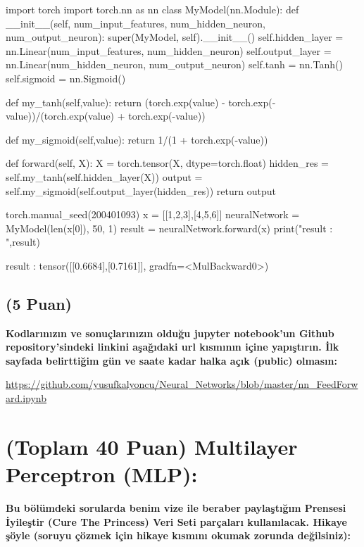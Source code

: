 \documentclass[11pt]{article}
\begin{document}
\begin{python}
import torch
import torch.nn as nn
class MyModel(nn.Module):
    def __init__(self, num_input_features, num_hidden_neuron, num_output_neuron):
        super(MyModel, self).__init__()
        self.hidden_layer = nn.Linear(num_input_features, num_hidden_neuron)
        self.output_layer = nn.Linear(num_hidden_neuron, num_output_neuron)
        self.tanh = nn.Tanh()
        self.sigmoid = nn.Sigmoid()
        
    def my_tanh(self,value):
        return (torch.exp(value) - torch.exp(-value))/(torch.exp(value) + torch.exp(-value))
    
    def my_sigmoid(self,value):
        return 1/(1 + torch.exp(-value))

    def forward(self, X):
        X = torch.tensor(X, dtype=torch.float)
        hidden_res = self.my_tanh(self.hidden_layer(X))
        output = self.my_sigmoid(self.output_layer(hidden_res))
        return output
        
torch.manual_seed(200401093)
x = [[1,2,3],[4,5,6]]
neuralNetwork = MyModel(len(x[0]), 50, 1)
result = neuralNetwork.forward(x)
print("result : ",result)
\end{python}

result :  tensor([[0.6684],[0.7161]], gradfn=<MulBackward0>)

\subsection{(5 Puan)} \textbf{Kodlarınızın ve sonuçlarınızın olduğu jupyter notebook'un Github repository'sindeki linkini aşağıdaki url kısmının içine yapıştırın. İlk sayfada belirttiğim gün ve saate kadar halka açık (public) olmasın:}

\url{https://github.com/yusufkalyoncu/Neural_Networks/blob/master/nn_FeedForward.ipynb}

\section{(Toplam 40 Puan) Multilayer Perceptron (MLP):} 
\textbf{Bu bölümdeki sorularda benim vize ile beraber paylaştığım Prensesi İyileştir (Cure The Princess) Veri Seti parçaları kullanılacak. Hikaye şöyle (soruyu çözmek için hikaye kısmını okumak zorunda değilsiniz):} 
\end{document}
